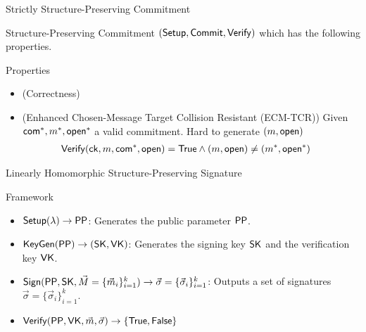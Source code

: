 \begin{frame}{Strictly Structure-Preserving Commitment~\cite{DBLP:conf/eurocrypt/AbeKOT15}}

	Structure-Preserving Commitment $({\mathsf{Setup}}, {\mathsf{Commit}}, {\mathsf{Verify}})$ which has the following properties.
  \begin{block}{Properties}
    \begin{itemize}
    \item {\color{blue}(Correctness)} %
    \item {\color{blue}(Enhanced Chosen-Message Target Collision Resistant (ECM-TCR))} Given $\mathsf{com}^*, m^*, \mathsf{open}^*$ a valid commitment. Hard to generate $(m, \mathsf{open})$ \st
      \begin{align*}
        {\mathsf{Verify}}(\mathsf{ck}, m, \mathsf{com}^*, \mathsf{open}) &= \mathsf{True} \wedge (m, \mathsf{open}) \neq (m^*, \mathsf{open}^*)
      \end{align*}
    \end{itemize}
  \end{block}


\end{frame}


\begin{frame}{Linearly Homomorphic Structure-Preserving Signature}
  \begin{block}{Framework}
  \begin{itemize}
  \item $\boldmath{{\mathsf{Setup}}(\lambda) \to \mathsf{PP}}$: Generates the public parameter $\mathsf{PP}$.
  \item $\boldmath{{\mathsf{KeyGen}}(\mathsf{PP}) \to (\mathsf{SK}, \mathsf{VK})}$: Generates the signing key $\mathsf{SK}$ and the verification key $\mathsf{VK}$.
  \item $\boldmath{{\mathsf{Sign}}(\mathsf{PP}, \mathsf{SK}, \vec{M} = \{\vec{m}_i\}_{i=1}^k) \to \vec{\sigma} = \{\vec{\sigma}_i\}_{i=1}^k}$: Outputs a set of signatures $\vec{\sigma} = \{\vec{\sigma}_i\}_{i=1}^k$.
  \item $\boldmath{{\mathsf{Verify}}(\mathsf{PP}, \mathsf{VK}, \vec{m}, \vec{\sigma}) \to \{\mathsf{True}, \mathsf{False}\}}$
  \end{itemize}
  \end{block}
\end{frame}


